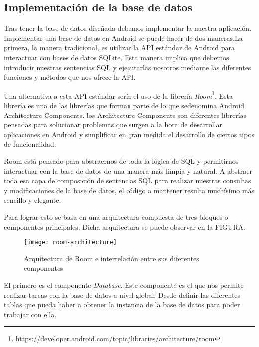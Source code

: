 \subsection{Implementación de la base de datos}

Tras tener la base de datos diseñada debemos implementar la nuestra aplicación. Implementar una base de datos en Android se puede hacer de dos maneras.La primera, la manera tradicional, es utilizar la API estándar de Android para interactuar con bases de datos SQLite. Esta manera implica que debemos introducir nuestras sentencias SQL y ejecutarlas nosotros mediante las diferentes funciones y métodos que nos ofrece la API.

Una alternativa a esta API estándar sería el uso de la librería \textit{Room}\footnote{\url{https://developer.android.com/topic/libraries/architecture/room}}. Esta librería es una de las librerías que forman parte de lo que sedenomina Android Architecture Components. los Architecture Components son diferentes librerías pensadas para solucionar problemas que surgen a la hora de desarrollar aplicaciones en Android y simplificar en gran medida el desarrollo de ciertos tipos de funcionalidad.

Room está pensado para abstraernos de toda la lógica de SQL y permitirnos interactuar con la base de datos de una manera más limpia y natural. A abstraer toda esa capa de composición de sentencias SQL para realizar nuestras consultas y modificaciones de la base de datos, el código a mantener resulta muchísimo más sencillo y elegante.

Para lograr esto se basa en una arquitectura compuesta de tres bloques o componentes principales. Dicha arquitectura se puede observar en la FIGURA.

\begin{figure}[H]
	\centering
	\texttt{[image: room-architecture]}
	\caption{Arquitectura de Room e interrelación entre sus diferentes componentes}
	\label{fig:room-architecture}
\end{figure}

El primero es el componente \textit{Database}. Este componente es el que nos permite realizar tareas con la base de datos a nivel global. Desde definir las diferentes tablas que pueda haber a obtener la instancia de la base de datos para poder trabajar con ella.

\begin{code}
	\caption{Implementación de la clase AppDatabase}
	\label{code:roomDatabase}
	
\end{code}

